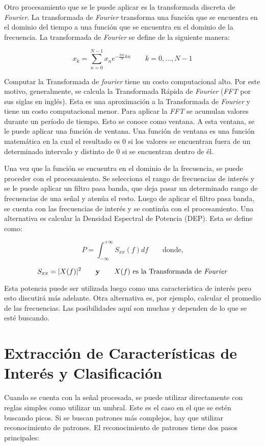 Otro procesamiento que se le puede aplicar es la transformada discreta de \emph{Fourier}. La transformada de \emph{Fourier} transforma una función que se encuentra en el dominio del tiempo a una función que se encuentra en el dominio de la frecuencia. La transformada de \emph{Fourier} se define de la siguiente manera:

$$ x_{k} = \sum_{n=0}^{N-1} x_{n}e^{-\frac{2 \pi i}{N}kn} \qquad k = 0,\hdots, N - 1 $$

Computar la Transformada de \emph{fourier} tiene un costo computacional alto. Por este motivo, generalmente, se calcula la Transformada Rápida de \emph{Fourier} (\emph{FFT} por sus siglas en inglés). Esta es una aproximación a la Transformada de \emph{Fourier} y tiene un costo computacional menor. Para aplicar la \emph{FFT} se acumulan valores durante un período de tiempo. Esto se conoce como ventana. A esta ventana, se le puede aplicar una función de ventana. Una función de ventana es una función matemática en la cual el resultado es $0$ si los valores se encuentran fuera de un determinado intervalo y distinto de $0$ si se encuentran dentro de él. 

Una vez que la función se encuentra en el dominio de la frecuencia, se puede proceder con el procesamiento. Se selecciona el rango de frecuencias de interés y se le puede aplicar un filtro pasa banda, que deja pasar un determinado rango de frecuencias de una señal y atenúa el resto. Luego de aplicar el filtro pasa banda, se cuenta con las frecuencias de interés y se continúa con el procesamiento. Una alternativa es calcular la Densidad Espectral de Potencia (DEP). Esta se define como:

$$ P = \int_{-\infty}^{+\infty} S_{xx} (f) df \qquad  \textrm{donde,}$$

$$ S_{xx} = |X(f)|^{2} \qquad \textbf{y} \qquad X(f) \textrm{ es la Transformada de \emph{Fourier}} $$

Esta potencia puede ser utilizada luego como una característica de interés pero esto discutirá más adelante. Otra alternativa  es, por ejemplo, calcular el promedio de las frecuencias. Las posibilidades aquí son muchas y dependen de lo que se esté buscando.

\section{Extracción de Características de Interés y Clasificación}

Cuando se cuenta con la señal procesada, se puede utilizar directamente con reglas simples como utilizar un umbral. Este es el caso en el que se estén buscando picos. Si se buscan patrones más complejos, hay que utilizar reconocimiento de patrones. El reconocimiento de patrones tiene dos pasos principales:

